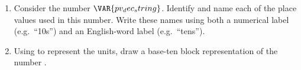 
\begin{enumerate}
    \item Consider the number $\VAR{pv_dec_string}$. Identify and name each of the place values used in this number. Write these names using both a numerical label (e.g.\ ``10s'') and an English-word label (e.g.\ ``tens'').

    \vspace{20pt}
    \begin{ansenv}
    \end{ansenv}
    \vfill

    \item Using  to represent the units, draw a base-ten block representation of the number .

    \vspace{20pt}
    \begin{ansenv}
    \end{ansenv}
    \vfill
\end{enumerate}

\newpage


